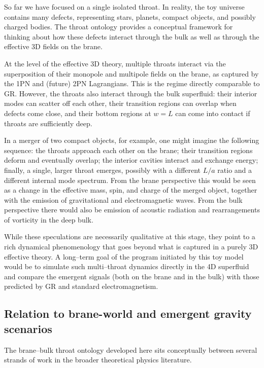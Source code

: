 \documentclass[12pt]{article}
\begin{document}
So far we have focused on a single isolated throat.  In reality, the toy
universe contains many defects, representing stars, planets, compact
objects, and possibly charged bodies.  The throat ontology provides a
conceptual framework for thinking about how these defects interact through
the bulk as well as through the effective 3D fields on the brane.

At the level of the effective 3D theory, multiple throats interact via the
superposition of their monopole and multipole fields on the brane, as
captured by the 1PN and (future) 2PN Lagrangians.  This is the regime
directly comparable to GR.  However, the throats also interact through the
bulk superfluid: their interior modes can scatter off each other, their
transition regions can overlap when defects come close, and their bottom
regions at $w=L$ can come into contact if throats are sufficiently deep.

In a merger of two compact objects, for example, one might imagine the
following sequence: the throats approach each other on the brane; their
transition regions deform and eventually overlap; the interior cavities
interact and exchange energy; finally, a single, larger throat emerges,
possibly with a different $L/a$ ratio and a different internal mode
spectrum.  From the brane perspective this would be seen as a change in the
effective mass, spin, and charge of the merged object, together with the
emission of gravitational and electromagnetic waves.  From the bulk
perspective there would also be emission of acoustic radiation and
rearrangements of vorticity in the deep bulk.

While these speculations are necessarily qualitative at this stage, they
point to a rich dynamical phenomenology that goes beyond what is captured in
a purely 3D effective theory.  A long--term goal of the program initiated by
this toy model would be to simulate such multi--throat dynamics directly in
the 4D superfluid and compare the emergent signals (both on the brane and in
the bulk) with those predicted by GR and standard electromagnetism.

\subsection{Relation to brane-world and emergent gravity scenarios}
\label{subsec:relation_other_models}

The brane--bulk throat ontology developed here sits conceptually between
several strands of work in the broader theoretical physics literature.
\end{document}
